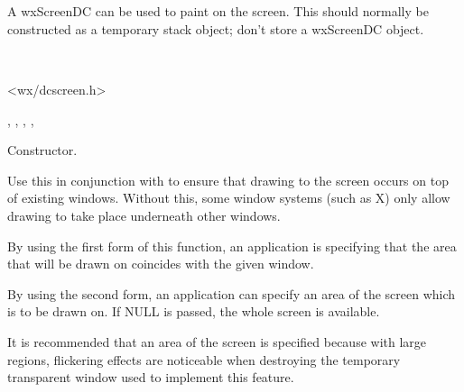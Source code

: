 \section{}\label{wxscreendc}

A wxScreenDC can be used to paint on the screen.
This should normally be constructed as a temporary stack object; don't store
a wxScreenDC object.


\\


<wx/dcscreen.h>




, , ,\rtfsp
{}, 


\label{wxscreendcctor}


Constructor.

\label{wxscreendcstartdrawingontop}



Use this in conjunction with  to
ensure that drawing to the screen occurs on top of existing windows. Without this,
some window systems (such as X) only allow drawing to take place underneath
other windows.

By using the first form of this function, an application is specifying that
the area that will be drawn on coincides with the given window.

By using the second form, an application can specify an area of the screen
which is to be drawn on. If NULL is passed, the whole screen is available.

It is recommended that an area of the screen is specified because with large regions,
flickering effects are noticeable when destroying the temporary transparent window used
to implement this feature.

